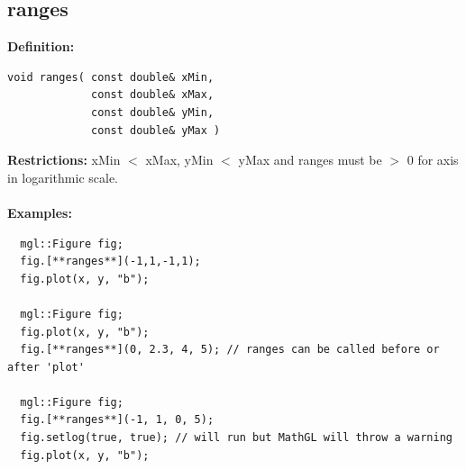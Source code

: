 \documentclass[a4paper]{article}
\newcommand{\command}[1]{\subsection{#1}}
\begin{document}
\command{ranges}

\textbf{Definition:}
\begin{lstlisting}
void ranges( const double& xMin, 
             const double& xMax, 
             const double& yMin, 
             const double& yMax )
\end{lstlisting}
%
\textbf{Restrictions:} xMin $<$ xMax, yMin $<$ yMax and ranges must be $>$ 0 for axis in logarithmic scale. \\ \\
%
\textbf{Examples:}
\begin{lstlisting}
  mgl::Figure fig;
  fig.[**ranges**](-1,1,-1,1);
  fig.plot(x, y, "b");

  mgl::Figure fig;
  fig.plot(x, y, "b");
  fig.[**ranges**](0, 2.3, 4, 5); // ranges can be called before or after 'plot'

  mgl::Figure fig;
  fig.[**ranges**](-1, 1, 0, 5);
  fig.setlog(true, true); // will run but MathGL will throw a warning 
  fig.plot(x, y, "b");
\end{lstlisting}
\end{document}
